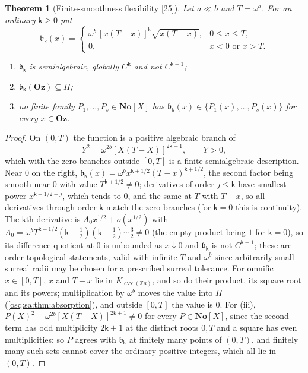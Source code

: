 \documentclass[11pt,letterpaper]{article}
\numberwithin{equation}{section}
\newtheorem{theorem}{Theorem}[section]
\theoremstyle{definition}
\theoremstyle{remark}
\theoremstyle{plain}
\newcommand{\No}{\mathbf{No}}
\newcommand{\Oz}{\mathbf{Oz}}
\newcommand{\Z}{\mathbb Z}
\newcommand{\src}[1]{\textup{\textsf{[#1]}}}
\begin{document}
\begin{theorem}[Finite-smoothness flexibility \src{25}]\label{osq:sa:thm:bumps}
Let $a\ll b$ and $T=\omega^a$. For an ordinary $\mathsf k\ge0$ put
\begin{equation}\label{osq:sa:eq:bump}
 \mathfrak b_{\mathsf k}(x)=\begin{cases}\omega^b\,[x(T-x)]^{\mathsf k}\sqrt{x(T-x)},&0\le x\le T,\\ 0,&x<0\text{ or }x>T.\end{cases}
\end{equation}
\begin{enumerate}
\item $\mathfrak b_{\mathsf k}$ is semialgebraic, globally $C^{\mathsf k}$ and not $C^{\mathsf k+1}$;
\item $\mathfrak b_{\mathsf k}(\Oz)\subseteq\Pi$;
\item no finite family $P_1,\dots,P_s\in\No[X]$ has $\mathfrak b_{\mathsf k}(x)\in\{P_1(x),\dots,P_s(x)\}$ for every $x\in\Oz$.
\end{enumerate}
\end{theorem}
\begin{proof}
On $(0,T)$ the function is a positive algebraic branch of
\begin{equation}\label{osq:sa:eq:bumpeq}
 Y^2=\omega^{2b}[X(T-X)]^{2\mathsf k+1},\qquad Y>0,
\end{equation}
which with the zero branches outside $[0,T]$ is a finite semialgebraic description. Near $0$ on the right, $\mathfrak b_{\mathsf k}(x)=\omega^bx^{\mathsf
k+1/2}(T-x)^{\mathsf k+1/2}$, the second factor being smooth near $0$ with value $T^{\mathsf k+1/2}\ne0$; derivatives of order $j\le\mathsf k$ have smallest
power $x^{\mathsf k+1/2-j}$, which tends to $0$, and the same at $T$ with $T-x$, so all derivatives through order $\mathsf k$ match the zero branches (for
$\mathsf k=0$ this is continuity). The $\mathsf k$th derivative is $A_0x^{1/2}+o(x^{1/2})$ with $A_0=\omega^bT^{\mathsf k+1/2}(\mathsf k+\frac12)(\mathsf
k-\frac12)\cdots\frac32\ne0$ (the empty product being $1$ for $\mathsf k=0$), so its difference quotient at $0$ is unbounded as $x\downarrow0$ and
$\mathfrak b_{\mathsf k}$ is not $C^{\mathsf k+1}$; these are order-topological statements, valid with infinite $T$ and $\omega^b$ since arbitrarily small
surreal radii may be chosen for a prescribed surreal tolerance. For omnific $x\in[0,T]$, $x$ and $T-x$ lie in $K_{\operatorname{cvx}(\Z a)}$, and so do
their product, its square root and its powers; multiplication by $\omega^b$ moves the value into $\Pi$ (\cref{osq:sa:thm:absorption}), and outside $[0,T]$
the value is $0$. For (iii), $P(X)^2-\omega^{2b}[X(T-X)]^{2\mathsf k+1}\ne0$ for every $P\in\No[X]$, since the second term has odd multiplicity $2\mathsf
k+1$ at the distinct roots $0,T$ and a square has even multiplicities; so $P$ agrees with $\mathfrak b_{\mathsf k}$ at finitely many points of $(0,T)$, and
finitely many such sets cannot cover the ordinary positive integers, which all lie in $(0,T)$.
\end{proof}
\end{document}
